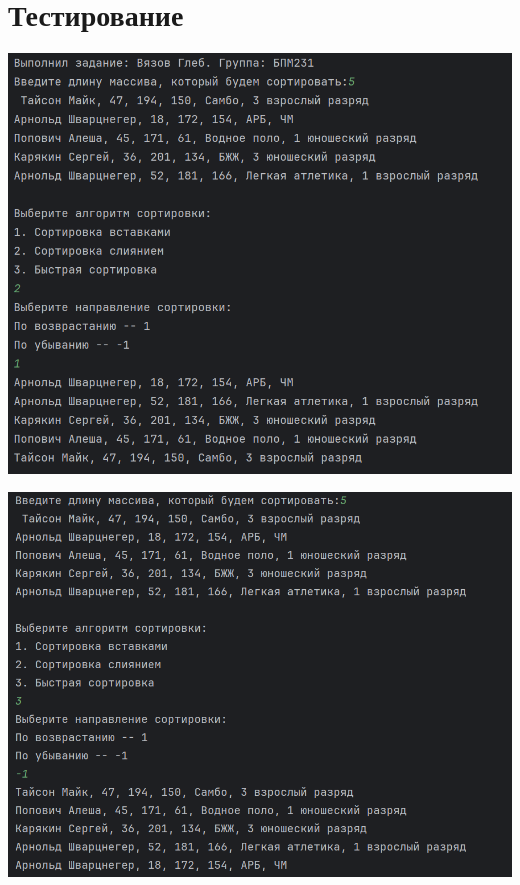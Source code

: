 \documentclass[12pt]{article}
\begin{document}
\section*{Тестирование}
\includegraphics[scale=0.8]{img1}

\includegraphics[scale=0.8]{img2}
\end{document}
